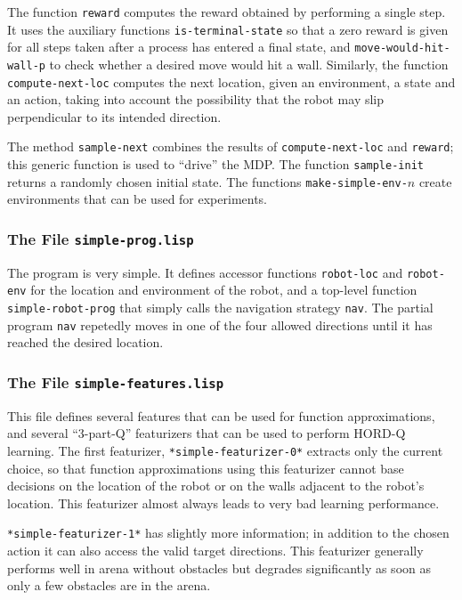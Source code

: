 \documentclass[a4paper]{amsart}
\begin{document}
The function \texttt{reward} computes the reward obtained by
performing a single step.  It uses the auxiliary functions
\texttt{is-terminal-state} so that a zero reward is given for all
steps taken after a process has entered a final state, and
\texttt{move-would-hit-wall-p} to check whether a desired move would
hit a wall.  Similarly, the function \texttt{compute-next-loc}
computes the next location, given an environment, a state and an
action, taking into account the possibility that the robot may slip
perpendicular to its intended direction.

The method \texttt{sample-next} combines the results of
\texttt{compute-next-loc} and \texttt{reward}; this generic function
is used to ``drive'' the MDP.  The function \texttt{sample-init}
returns a randomly chosen initial state.  The functions
\texttt{make-simple-env-}$n$ create environments that can be used for
experiments.

\subsubsection{The File \texttt{simple-prog.lisp}}
\label{sec:file-simple-prog.lisp}

The program is very simple.  It defines accessor functions
\texttt{robot-loc} and \texttt{robot-env} for the location and
environment of the robot, and a top-level function
\texttt{simple-robot-prog} that simply calls the navigation strategy
\texttt{nav}.  The partial program \texttt{nav} repetedly moves in one
of the four allowed directions until it has reached the desired
location.


\subsubsection{The File \texttt{simple-features.lisp}}
\label{sec:file-simple-features.lisp}

This file defines several features that can be used for function
approximations, and several ``3-part-Q'' featurizers that can be used
to perform HORD-Q learning.  The first featurizer,
\texttt{*simple-featurizer-0*} extracts only the current choice, so
that function approximations using this featurizer cannot base
decisions on the location of the robot or on the walls adjacent to the
robot's location.  This featurizer almost always leads to very bad
learning performance.

\texttt{*simple-featurizer-1*} has slightly more information; in
addition to the chosen action it can also access the valid target
directions.  This featurizer generally performs well in arena without
obstacles but degrades significantly as soon as only a few obstacles
are in the arena.
\end{document}
